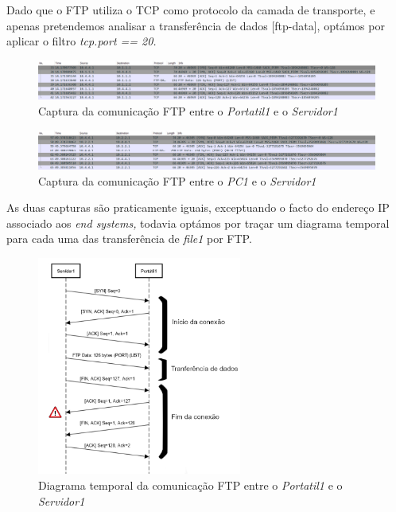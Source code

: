         Dado que o FTP utiliza o TCP como protocolo da camada de transporte, e apenas pretendemos analisar a transferência de dados [ftp-data], optámos por aplicar o filtro \textit{tcp.port == 20.}

        \begin{figure}[hb!]
            \centering
            \includegraphics[width=\textwidth]{Imagens/3.png}
            \caption{Captura da comunicação FTP entre o \textit{Portatil1} e o \textit{Servidor1}}
            \vspace{-10pt}
        \end{figure}

        \newpage

        \begin{figure}[hb!]
            \centering
            \includegraphics[width=\textwidth]{Imagens/4.png}
            \caption{Captura da comunicação FTP entre o \textit{PC1} e o \textit{Servidor1}}
            \vspace{-10pt}
        \end{figure}

        As duas capturas são praticamente iguais, exceptuando o facto do endereço IP associado aos \textit{end systems,} todavia optámos por traçar um diagrama temporal para cada uma das transferência de \textit{file1} por FTP. 

        \begin{figure}[hb!]
            \centering
            \includegraphics[width=0.6\textwidth]{Imagens/5.png}
            \caption{Diagrama temporal da comunicação FTP entre o \textit{Portatil1} e o \textit{Servidor1}}
            \vspace{-10pt}
        \end{figure}

